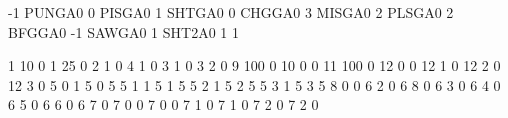 \def\dtClipAmmo#1{\ifcase#1 10\or4\or20\or1\else0\fi}

\def\dt@weapdef#1#2#3{%
  \expandafter\gdef\csname dtUT#1\endcsname{#2}%
  \expandafter\gdef\csname dtUS#1\endcsname{#3}}
\dt@weapdef{0}{-1}{PUNGA0}\dt@weapdef{1}{0}{PISGA0}
\dt@weapdef{2}{1}{SHTGA0}\dt@weapdef{3}{0}{CHGGA0}
\dt@weapdef{4}{3}{MISGA0}\dt@weapdef{5}{2}{PLSGA0}
\dt@weapdef{6}{2}{BFGGA0}\dt@weapdef{7}{-1}{SAWGA0}
\dt@weapdef{8}{1}{SHT2A0}
\expandafter\gdef\csname dtUW0\endcsname{1}
\expandafter\gdef\csname dtUW1\endcsname{1}

\def\dtItem#1#2#3#4{%
  \expandafter\gdef\csname dtIK#1\endcsname{#2}%
  \expandafter\gdef\csname dtIA#1\endcsname{#3}%
  \expandafter\gdef\csname dtIB#1\endcsname{#4}}
\dtItem{2011}{1}{10}{0}\dtItem{2012}{1}{25}{0}
\dtItem{2014}{2}{1}{0}\dtItem{2015}{4}{1}{0}
\dtItem{2018}{3}{1}{0}\dtItem{2019}{3}{2}{0}
\dtItem{2013}{9}{100}{0}\dtItem{83}{10}{0}{0}\dtItem{2023}{11}{100}{0}
\dtItem{2022}{12}{0}{0}\dtItem{2024}{12}{1}{0}
\dtItem{2025}{12}{2}{0}\dtItem{2045}{12}{3}{0}
\dtItem{2007}{5}{0}{1}\dtItem{2048}{5}{0}{5}
\dtItem{2008}{5}{1}{1}\dtItem{2049}{5}{1}{5}
\dtItem{2047}{5}{2}{1}\dtItem{17}{5}{2}{5}
\dtItem{2010}{5}{3}{1}\dtItem{2046}{5}{3}{5}
\dtItem{8}{8}{0}{0}
\dtItem{2001}{6}{2}{0}\dtItem{82}{6}{8}{0}\dtItem{2002}{6}{3}{0}
\dtItem{2003}{6}{4}{0}\dtItem{2004}{6}{5}{0}\dtItem{2006}{6}{6}{0}
\dtItem{2005}{6}{7}{0}
\dtItem{5}{7}{0}{0}\dtItem{40}{7}{0}{0}
\dtItem{6}{7}{1}{0}\dtItem{39}{7}{1}{0}
\dtItem{13}{7}{2}{0}\dtItem{38}{7}{2}{0}

